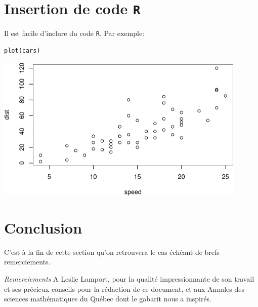 \documentclass[10pt]{article}
\begin{document}
\hypertarget{insertion-de-code-r}{%
\section{\texorpdfstring{Insertion de code
\texttt{R}}{Insertion de code R}}\label{insertion-de-code-r}}

Il est facile d'inclure du code \texttt{R}. Par exemple:

\begin{verbatim}
plot(cars)
\end{verbatim}

\includegraphics[width=0.9\textwidth]{article_template_amq_article_files/figure-latex/unnamed-chunk-1-1}

\hypertarget{conclusion}{%
\section{\texorpdfstring{Conclusion
\label{sec6}}{Conclusion }}\label{conclusion}}

C'est à la fin de cette section qu'on retrouvera le cas échéant de brefs
remerciements.

\emph{Remerciements} A Leslie Lamport\cite{lamp}, pour la qualité
impressionnante de son travail et ses précieux conseils pour la
rédaction de ce document, et aux Annales des sciences mathématiques du
Québec dont le gabarit nous a inspirés.


\end{document}
